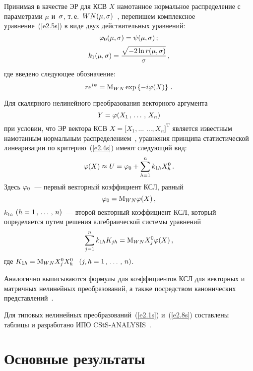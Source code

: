\begin{multicols}{2}
Принимая в качестве ЭР для КСВ $X$ намотанное нормальное распределение с параметрами  
$\mu$ и~$\sigma$, т.\,е.\ $WN(\mu,\sigma)$~\cite{4-sin, 7-sin}, 
перепишем комплексное уравнение~(\ref{e2.5s}) в виде двух действительных уравнений:
\begin{equation*}
\vrp_0 (\mu,\si) =\psi (\mu,\si)\,; %
\end{equation*}
\begin{equation*}
k_1 (\mu,\si) =\fr{\sqrt{-2\ln r(\mu,\si)}}{\si}\,, %
\end{equation*}
где введено следующее обозначение: 
$$
re^{i\psi} ={\rm M}_{WN} \exp \left\{ -i \varphi (X)\right\}\,.
$$

Для скалярного нелинейного преобразования векторного аргумента
\begin{equation}
Y=\varphi (X_1\,,\,\ldots\,,\, X_n)\label{e2.8s}
\end{equation}
при условии, что ЭР вектора КСВ  $X= [ X_1, \ldots$\linebreak 
$\ldots , X_n]^{\mathrm{T}}$ является известным 
намотанным нормальным распределением~\cite{4-sin, 7-sin}, 
уравнения принципа статистической линеаризации по критерию~(\ref{e2.4s}) имеют следующий вид:
\begin{equation*}
\vrp (X) \approx U = \vrp_0 +\sss_{h=1}^n k_{1h} X_h^0\,. %
\end{equation*}
Здесь $\varphi_0$~--- первый векторный коэффициент КСЛ, равный
\begin{equation*}
\vrp_0 = \mm_{WN} \vrp(X)\,, %
\end{equation*}
$k_{1h}$ $(h=1\,,\,\ldots\,,\, n)$~--- второй векторный коэффициент КСЛ, который 
определяется путем решения алгебраической системы уравнений
\begin{equation*}
\sss_{j=1}^n k_{1h} K_{jh} = \mm_{WN} X_j^0 \vrp (X)\,, %
\end{equation*}
где $K_{1h} ={\rm M}_{WN} X_j^0 X_h^0$\ \,$(j,h\hm=1\tr n)$.

Аналогично выписываются формулы для коэффициентов 
КСЛ для векторных и матричных нелинейных преобразований, 
а также посредством канонических представлений~\cite{1-sin}.

Для типовых нелинейных преобразований~(\ref{e2.1s}) и~(\ref{e2.8s}) 
составлены таблицы и разработано ИПО 
CStS-ANALYSIS~\cite{11-sin}.

\section{Основные результаты}


\end{multicols}
